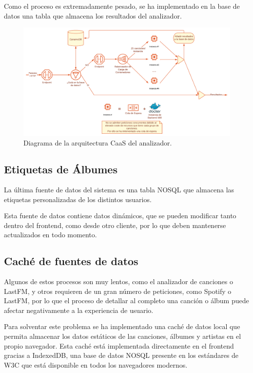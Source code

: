 Como el proceso es extremadamente pesado, se ha implementado en la base
de datos una tabla que almacena los resultados del analizador. 

\begin{figure}
    \centering
    \includegraphics{img/5/ludwig_caas.png}
    \caption{Diagrama de la arquitectura CaaS del analizador.}
    \label{fig:caas_ludwig}
\end{figure}

\subsection{Etiquetas de Álbumes}\label{etiquetas-de-uxe1lbumes}

La última fuente de datos del sistema es una tabla NOSQL que almacena
las etiquetas personalizadas de los distintos usuarios.

Esta fuente de datos contiene datos dinámicos, que se pueden modificar
tanto dentro del frontend, como desde otro cliente, por lo que deben
mantenerse actualizados en todo momento.


\subsection{Caché de fuentes de
datos}\label{cachuxe9-de-fuentes-de-datos}

Algunos de estos procesos son muy lentos, como el analizador de
canciones o LastFM, y otros requieren de un gran número de peticiones,
como Spotify o LastFM, por lo que el proceso de detallar al completo una
canción o álbum puede afectar negativamente a la experiencia de usuario.

Para solventar este problema se ha implementado una caché de datos local que
permita almacenar los datos estáticos de las canciones, álbumes y
artistas en el propio navegador.
Esta caché está implementada directamente en el frontend gracias a
IndexedDB, una base de datos NOSQL presente en los estándares de W3C que
está disponible en todos los navegadores modernos.

